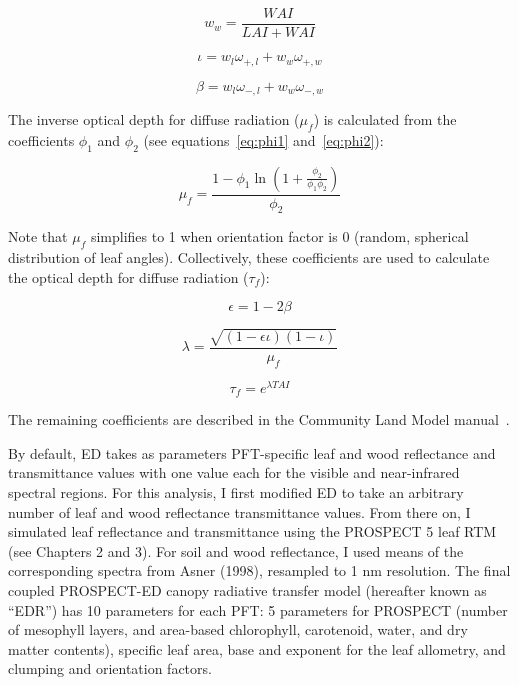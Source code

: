 \begin{equation}\label{eq:ww}
  w_w = \frac{WAI}{LAI + WAI}
\end{equation}

\begin{equation}\label{eq:scatter}
  \iota = w_l \omega_{+,l} + w_w \omega_{+,w}
\end{equation}

\begin{equation}\label{eq:backscatter}
  \beta = w_l \omega_{-,l} + w_w \omega_{-,w}
\end{equation}

The inverse optical depth for diffuse radiation ($\mu_f$) is calculated from the coefficients $\phi_1$ and $\phi_2$ (see equations~\ref{eq:phi1} and~\ref{eq:phi2}):

\begin{equation}
   \mu_f = \frac{1 - \phi_1 \ln{(1 + \frac{\phi_2}{\phi_1 \phi_2})}}{\phi_2} 
\end{equation}

Note that $\mu_f$ simplifies to 1 when orientation factor is 0 (random, spherical distribution of leaf angles).
Collectively, these coefficients are used to calculate the optical depth for diffuse radiation ($\tau_f$):

\begin{equation}
  \epsilon = 1 - 2\beta
\end{equation}

\begin{equation}
  \lambda = \frac{\sqrt{(1 - \epsilon\iota) (1 - \iota)}}{\mu_f}
\end{equation}

\begin{equation}
  \tau_f = e ^ {\lambda TAI}
\end{equation}

The remaining coefficients are described in the Community Land Model manual~\cite{clm45_note}.

By default, ED takes as parameters PFT-specific leaf and wood reflectance and transmittance values with one value each for the visible and near-infrared spectral regions. 
For this analysis, I first modified ED to take an arbitrary number of leaf and wood reflectance transmittance values.
From there on, I simulated leaf reflectance and transmittance using the PROSPECT 5 leaf RTM (see Chapters 2 and 3).
For soil and wood reflectance, I used means of the corresponding spectra from Asner (1998), resampled to 1 nm resolution. \nocite{asner_1998_biophysical}
The final coupled PROSPECT-ED canopy radiative transfer model (hereafter known as ``EDR'') has 10 parameters for each PFT\@:
5 parameters for PROSPECT (number of mesophyll layers, and area-based chlorophyll, carotenoid, water, and dry matter contents),
specific leaf area,
base and exponent for the leaf allometry,
and clumping and orientation factors.

